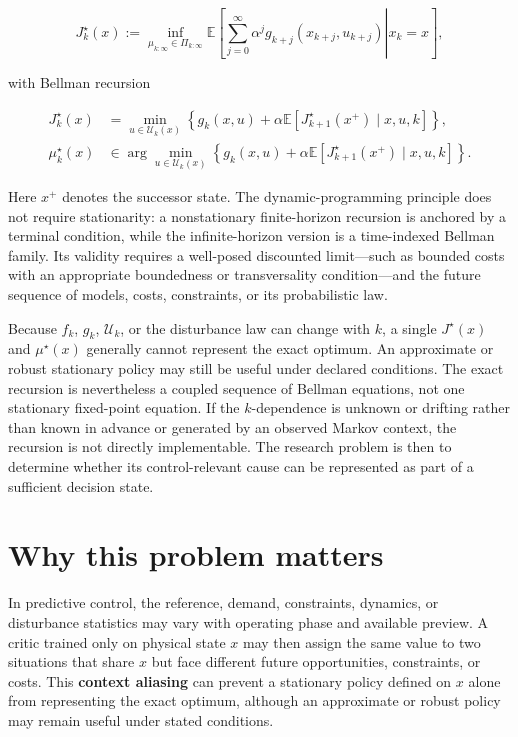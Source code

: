 \documentclass[a4paper]{article}
\begin{document}
\begin{equation}
  J_k^\star(x)
  :=
  \inf_{\mu_{k:\infty}\in\Pi_{k:\infty}}
  \mathbb E
  \!\left[
  \left.
  \sum_{j=0}^{\infty}
  \alpha^j
  g_{k+j}(x_{k+j},u_{k+j})
  \right|
  x_k=x
  \right],
\end{equation}

with Bellman recursion

\begin{equation}
  \begin{aligned}
    J_k^\star(x)
    &=
    \min_{u\in\mathcal U_k(x)}
    \left\{
    g_k(x,u)
    +
    \alpha
    \mathbb E
    \!\left[
    J_{k+1}^\star(x^+)
    \mid x,u,k
    \right]
    \right\},\\
    \mu_k^\star(x)
    &\in
    \arg\min_{u\in\mathcal U_k(x)}
    \left\{
    g_k(x,u)
    +
    \alpha
    \mathbb E
    \!\left[
    J_{k+1}^\star(x^+)
    \mid x,u,k
    \right]
    \right\}.
  \end{aligned}
\end{equation}

Here $x^+$ denotes the successor state. The dynamic-programming principle does
not require stationarity: a nonstationary finite-horizon recursion is anchored
by a terminal condition, while the infinite-horizon version is a time-indexed
Bellman family. Its validity requires a well-posed discounted limit---such as
bounded costs with an appropriate boundedness or transversality
condition---and the future sequence of models, costs, constraints, or its
probabilistic law.

Because $f_k$, $g_k$, $\mathcal U_k$, or the disturbance law can change with
$k$, a single $J^\star(x)$ and $\mu^\star(x)$ generally cannot represent the
exact optimum. An approximate or robust stationary policy may still be useful
under declared conditions. The exact recursion is nevertheless a coupled
sequence of Bellman equations, not one stationary fixed-point equation. If
the $k$-dependence is unknown or drifting rather than known in advance or
generated by an observed Markov context, the recursion is not directly
implementable. The research problem is then to determine whether its
control-relevant cause can be represented as part of a sufficient decision
state.

\section{Why this problem matters}

In predictive control, the reference, demand, constraints, dynamics, or
disturbance statistics may vary with operating phase and available preview. A
critic trained only on physical state $x$ may then assign the same value to
two situations that share $x$ but face different future opportunities,
constraints, or costs. This \textbf{context aliasing} can prevent a stationary
policy defined on $x$ alone from representing the exact optimum, although an
approximate or robust policy may remain useful under stated conditions.
\end{document}
